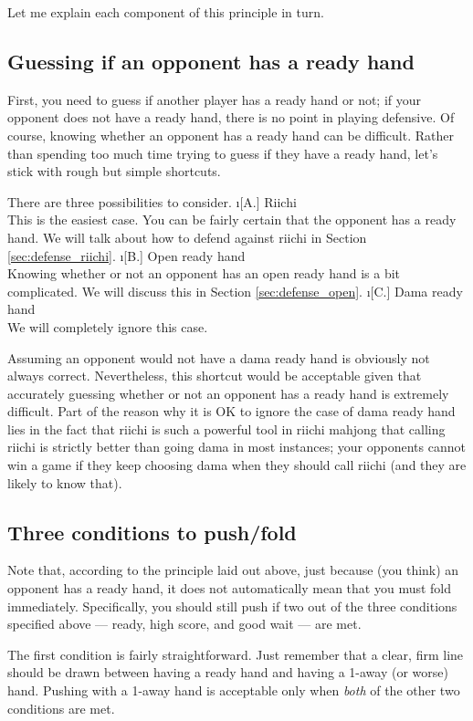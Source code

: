\noindent Let me explain each component of this principle in turn. 

\subsection{Guessing if an opponent has a ready hand}
First, you need to guess if another player has a ready hand or not; if your opponent does not have a ready hand, there is no point in playing defensive. Of course, knowing whether an opponent has a ready hand can be difficult. Rather than spending too much time trying to guess if they have a ready hand, let's stick with rough but simple shortcuts. 

There are three possibilities to consider. 
\bi
\i[A.] {\jap Riichi}\\
	This is the easiest case. You can be fairly certain that the opponent has a ready hand. We will talk about how to defend against riichi in Section \ref{sec:defense_riichi}.
\i[B.] Open ready hand\\
	Knowing whether or not an opponent has an open ready hand is a bit complicated. We will discuss this in Section \ref{sec:defense_open}. 
\i[C.] {\jap Dama} ready hand\\
	We will completely ignore this case.
\ei

\bigskip
Assuming an opponent would not have a {\jap dama} ready hand is obviously not always correct. Nevertheless, this shortcut would be acceptable given that accurately guessing whether or not an opponent has a ready hand is extremely difficult. Part of the reason why it is OK to ignore the case of {\jap dama} ready hand lies in the fact that riichi is such a powerful tool in riichi mahjong that calling riichi is strictly better than going {\jap dama} in most instances; your opponents cannot win a game if they keep choosing {\jap dama} when they should call riichi (and they are likely to know that). 

\subsection{Three conditions to push/fold}
Note that, according to the principle laid out above, just because (you think) an opponent has a ready hand, it does not automatically mean that you must fold immediately. Specifically, you should still push if two out of the three conditions  specified above --- ready, high score, and good wait --- are met. 

\bigskip
The first condition is fairly straightforward. Just remember that a clear, firm line should be drawn between having a ready hand and having a 1-away (or worse) hand. Pushing with a 1-away hand is acceptable only when \emph{both} of the other two conditions are met. 

